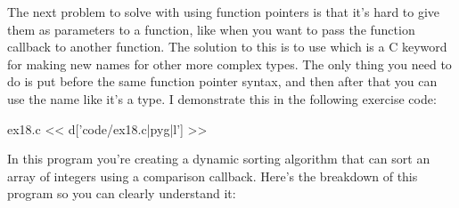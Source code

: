 The next problem to solve with using function pointers is that it's hard to
give them as parameters to a function, like when you want to pass the function
callback to another function.  The solution to this is to use 
which is a C keyword for making new names for other more complex types.
The only thing you need to do is put  before the same 
function pointer syntax, and then after that you can use the name like
it's a type.  I demonstrate this in the following exercise code:

\begin{code}{ex18.c}
<< d['code/ex18.c|pyg|l'] >>
\end{code}

In this program you're creating a dynamic sorting algorithm that can sort
an array of integers using a comparison callback.  Here's the breakdown
of this program so you can clearly understand it:

